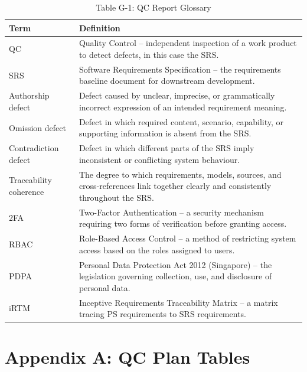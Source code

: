 \documentclass[11pt,a4paper]{article}
\begin{document}
\begin{table}[H]
\centering
\small
\renewcommand{\arraystretch}{1.4}
\begin{tabularx}{\textwidth}{|p{}|X|}
\hline
\rowcolor{tableheader}
\textbf{Term} & \textbf{Definition} \\
\hline
QC & Quality Control -- independent inspection of a work product to detect defects, in this case the SRS. \\
\hline
SRS & Software Requirements Specification -- the requirements baseline document for downstream development. \\
\hline
Authorship defect & Defect caused by unclear, imprecise, or grammatically incorrect expression of an intended requirement meaning. \\
\hline
Omission defect & Defect in which required content, scenario, capability, or supporting information is absent from the SRS. \\
\hline
Contradiction defect & Defect in which different parts of the SRS imply inconsistent or conflicting system behaviour. \\
\hline
Traceability coherence & The degree to which requirements, models, sources, and cross-references link together clearly and consistently throughout the SRS. \\
\hline
2FA & Two-Factor Authentication -- a security mechanism requiring two forms of verification before granting access. \\
\hline
RBAC & Role-Based Access Control -- a method of restricting system access based on the roles assigned to users. \\
\hline
PDPA & Personal Data Protection Act 2012 (Singapore) -- the legislation governing collection, use, and disclosure of personal data. \\
\hline
iRTM & Inceptive Requirements Traceability Matrix -- a matrix tracing PS requirements to SRS requirements. \\
\hline
\end{tabularx}
\caption*{Table G-1: QC Report Glossary}
\label{tab:qc-glossary}
\end{table}

\clearpage
{}
\setcounter{page}{1}
\renewcommand{\thepage}{A-\arabic{page}}
\section*{Appendix A: QC Plan Tables}
{}
\end{document}
